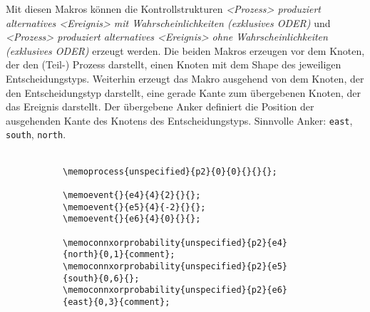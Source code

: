 \noindent Mit diesen Makros können die Kontrollstrukturen \textit{<Prozess> produziert alternatives <Ereignis> mit Wahrscheinlichkeiten (exklusives ODER)} und \textit{<Prozess> produziert alternatives <Ereignis> ohne Wahrscheinlichkeiten (exklusives ODER)} erzeugt werden.
Die beiden Makros erzeugen vor dem Knoten, der den (Teil-) Prozess darstellt, einen Knoten mit dem Shape des jeweiligen Entscheidungstyps. Weiterhin erzeugt das Makro ausgehend von dem Knoten, der den Entscheidungstyp darstellt, eine gerade Kante zum übergebenen Knoten, der das Ereignis darstellt. Der übergebene Anker definiert die Position der ausgehenden Kante des Knotens des Entscheidungstyps. Sinnvolle Anker: \texttt{east}, \texttt{south}, \texttt{north}.\\

\noindent\DescribeMacro{\memoconnxor}\newline
\DescribeMacro{\memoconnxorprobability}\\\medskip

\begin{figure}[htbp]
    \centering
    \caption[Beispiel: Produktion eines alternativen Ereignisses mit Wahrscheinlichkeit.]{Beispiel: Produktion eines alternativen Ereignisses mit Wahrscheinlichkeit.}
    \begin{subfigure}{0.4\textwidth}
        \centering
    \end{subfigure}
    \begin{subfigure}{0.6\textwidth}
        \centering
        \begin{lstlisting}
\memoprocess{unspecified}{p2}{0}{0}{}{}{};
                 
\memoevent{}{e4}{4}{2}{}{};       
\memoevent{}{e5}{4}{-2}{}{}; 
\memoevent{}{e6}{4}{0}{}{};
            
\memoconnxorprobability{unspecified}{p2}{e4}{north}{0,1}{comment};
\memoconnxorprobability{unspecified}{p2}{e5}{south}{0,6}{};
\memoconnxorprobability{unspecified}{p2}{e6}{east}{0,3}{comment};            
        \end{lstlisting}
    \end{subfigure}
    \label{fig:EntscheidungMit}
\end{figure}

